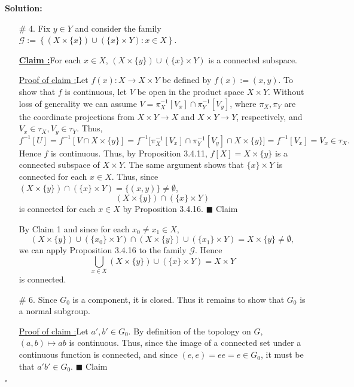 \documentclass[12pt]{article}
\newcounter{ProofCounter}
\newcounter{ClaimCounter}[ProofCounter]
\newenvironment{Solution}{\stepcounter{ProofCounter}\textbf{Solution:}}{\hfill$\square$}
\newenvironment{claim}[1]{\vspace{1mm}\stepcounter{ClaimCounter}\par\noindent\underline{\bf Claim \theClaimCounter:}\space#1}{}
\newenvironment{claimproof}[1]{\par\noindent\underline{Proof of claim \theClaimCounter:}\space#1}{\hfill $\blacksquare$ Claim \theClaimCounter}
\begin{document}
\begin{Solution}
\begin{enumerate}
    \item[\# 4.] Fix $y \in Y$ and consider the family $\mathcal{G} := \left\{ (X \times \{x\}) \cup (\{x\} \times Y) : x \in X \right\}$.

      \begin{claim}
        For each $x \in X$, $(X \times \{y\}) \cup (\{x\} \times Y)$ is a connected subspace.
      \end{claim}
      \begin{claimproof}
        Let $f(x) : X \rightarrow X \times Y$ be defined by $f(x) := (x,y)$. To show that $f$ is continuous, let $V$ be open in
        the product space $X \times Y$. Without loss of generality we can assume $V =
        \pi_{X}^{-1}[V_x] \cap \pi_{Y}^{-1}[V_y]$, where $\pi_{X}, \pi_{Y}$ are the coordinate projections from $X\times Y \rightarrow X$ and $X\times
        Y \rightarrow Y$, respectively, and $V_x \in \tau_{X}, V_y \in \tau_{Y}$. Thus,
        \[
          f^{-1}[U] = f^{-1}[V \cap X \times \{y\}] = f^{-1}\big[\pi_{X}^{-1}[V_x] \cap \pi_{Y}^{-1}[V_y] \cap X \times \{y\}\big] = f^{-1}[V_x] = V_x
          \in \tau_X.
        \]
        Hence $f$ is continuous. Thus, by Proposition 3.4.11, $f[X] = X\times \{y\}$ is a connected subspace of $X \times Y$. The same argument shows
        that $\{x\} \times Y$ is connected for each $x \in X$. Thus, since $(X \times \{y\}) \cap (\{x\} \times Y) = \{(x,y)\} \neq \emptyset$, 
        \[
          (X \times \{y\}) \cap (\{x\} \times Y)
        \]
        is connected for each $x \in X$ by Proposition 3.4.16.
      \end{claimproof}

      By Claim 1 and since for each $x_0 \neq x_1 \in X$, 
      \[
        (X \times \{y\}) \cup (\{x_0\} \times Y) \cap (X \times \{y\}) \cup (\{x_1\} \times Y) = X \times \{y\} \neq \emptyset,
      \]
      we can apply Proposition 3.4.16 to the family $\mathcal{G}$. Hence 
      \[
        \bigcup_{x \in X} (X \times \{y\}) \cup (\{x\} \times Y) = X \times Y
      \]
      is connected.

    \item[\# 6.] Since $G_0$ is a component, it is closed. Thus it remains to show that $G_0$ is a normal subgroup.

      \begin{claimproof}
        Let $a', b' \in G_0$. By definition of the topology on $G$, $(a,b) \mapsto ab$ is continuous. Thus, since the image of a connected set under a continuous function
        is connected, and since $(e,e) = ee = e \in G_0$, it must be that $a'b' \in G_0$.
      \end{claimproof}


\end{enumerate}
\end{Solution}
\end{document}
